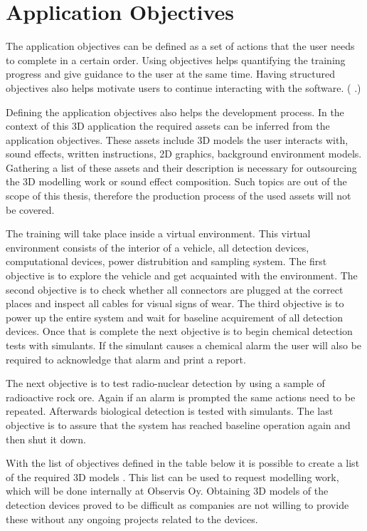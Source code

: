 \documentclass[12pt, a4paper,oneside, nocenter]{thesis}
\renewcommand{\citep}[1]{(\citeauthor{#1} \citeyear{#1}.)}
\begin{document}
\section{Application Objectives}
The application objectives can be defined as a set of actions that the user needs to complete in a certain order. Using objectives helps quantifying the training progress and give guidance to the user at the same time. Having structured objectives also helps motivate users to continue interacting with the software. \citep{goal-oriented-games}
\par
Defining the application objectives also helps the development process. In the context of this 3D application the required assets can be inferred from the application objectives. These assets include 3D models the user interacts with, sound effects, written instructions, 2D graphics, background environment models. Gathering a list of these assets and their description is necessary for outsourcing the 3D modelling work or sound effect composition. Such topics are out of the scope of this thesis, therefore the production process of the used assets will not be covered.
\par
The training will take place inside a virtual environment. This virtual environment consists of the interior of a vehicle, all detection devices, computational devices, power distrubition and sampling system. The first objective is to explore the vehicle and get acquainted with the environment. The second objective is to check whether all connectors are plugged at the correct places and inspect all cables for visual signs of wear. The third objective is to power up the entire system and wait for baseline acquirement of all detection devices. Once that is complete the next objective is to begin chemical detection tests with simulants. If the simulant causes a chemical alarm the user will also be required to acknowledge that alarm and print a report.
\par
The next objective is to test radio-nuclear detection by using a sample of radioactive rock ore. Again if an alarm is prompted the same actions need to be repeated. Afterwards biological detection is tested with simulants. The last objective is to assure that the system has reached baseline operation again and then shut it down.
\par
With the list of objectives defined in the table below it is possible to create a list of the required 3D models . This list can be used to request modelling work, which will be done internally at Observis Oy. Obtaining 3D models of the detection devices proved to be difficult as companies are not willing to provide these without any ongoing projects related to the devices.
\end{document}
